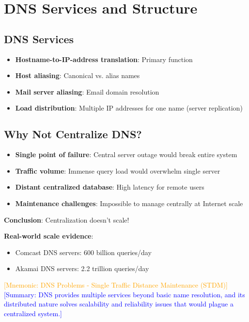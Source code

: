 \documentclass[12pt]{article}
\begin{document}
\section{DNS Services and Structure}
\subsection{DNS Services}

\begin{itemize}
    \item \textbf{Hostname-to-IP-address translation}: Primary function
    \item \textbf{Host aliasing}: Canonical vs. alias names
    \item \textbf{Mail server aliasing}: Email domain resolution
    \item \textbf{Load distribution}: Multiple IP addresses for one name (server replication)
\end{itemize}

\subsection{Why Not Centralize DNS?}
\begin{itemize}
    \item \textbf{Single point of failure}: Central server outage would break entire system
    \item \textbf{Traffic volume}: Immense query load would overwhelm single server
    \item \textbf{Distant centralized database}: High latency for remote users
    \item \textbf{Maintenance challenges}: Impossible to manage centrally at Internet scale
\end{itemize}

\textbf{Conclusion}: Centralization doesn't scale!

\textbf{Real-world scale evidence}:
\begin{itemize}
    \item Comcast DNS servers: 600 billion queries/day
    \item Akamai DNS servers: 2.2 trillion queries/day
\end{itemize}

\textcolor{orange}{[Mnemonic: DNS Problems - Single Traffic Distance Maintenance (STDM)]}
\textcolor{blue}{[Summary: DNS provides multiple services beyond basic name resolution, and its distributed nature solves scalability and reliability issues that would plague a centralized system.]}
\end{document}
